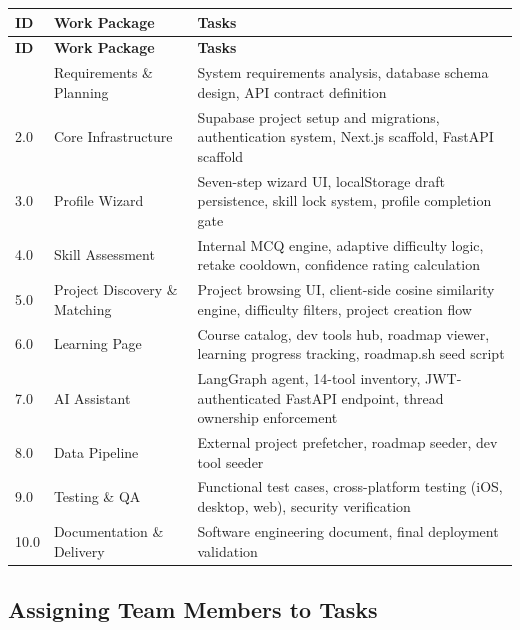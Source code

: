 \documentclass[12pt,a4paper]{article}
\begin{document}
\begin{longtable}{@{} C{1.2cm} L{4cm} L{9.3cm} @{}}
\toprule
\textbf{ID} & \textbf{Work Package} & \textbf{Tasks} \\
\midrule
\endfirsthead
\toprule
\textbf{ID} & \textbf{Work Package} & \textbf{Tasks} \\
\midrule
\endhead
\bottomrule
{} & Requirements \& Planning     & System requirements analysis, database schema design, API contract definition \\[4pt]
2.0 & Core Infrastructure           & Supabase project setup and migrations, authentication system, Next.js scaffold, FastAPI scaffold \\[4pt]
3.0 & Profile Wizard                & Seven-step wizard UI, localStorage draft persistence, skill lock system, profile completion gate \\[4pt]
4.0 & Skill Assessment              & Internal MCQ engine, adaptive difficulty logic, retake cooldown, confidence rating calculation \\[4pt]
5.0 & Project Discovery \& Matching & Project browsing UI, client-side cosine similarity engine, difficulty filters, project creation flow \\[4pt]
6.0 & Learning Page                 & Course catalog, dev tools hub, roadmap viewer, learning progress tracking, roadmap.sh seed script \\[4pt]
7.0 & AI Assistant                  & LangGraph agent, 14-tool inventory, JWT-authenticated FastAPI endpoint, thread ownership enforcement \\[4pt]
8.0 & Data Pipeline                 & External project prefetcher, roadmap seeder, dev tool seeder \\[4pt]
9.0 & Testing \& QA                 & Functional test cases, cross-platform testing (iOS, desktop, web), security verification \\[4pt]
10.0 & Documentation \& Delivery    & Software engineering document, final deployment validation \\
\end{longtable}

\subsection{Assigning Team Members to Tasks}
\end{document}
